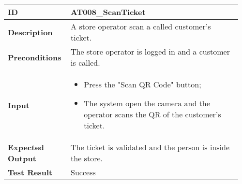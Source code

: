 \begin{table}[H]
	\centering
	\begin{tabular}{@{}p{0.25\linewidth}p{0.71\linewidth}@{}}
		\toprule
		\textbf{ID} & AT008\_ScanTicket \\
		\midrule
		\textbf{Description} & A store operator scan a called customer's ticket. \\
		\midrule
		\textbf{Preconditions} & The store operator is logged in and a customer is called.\\
		\midrule
		\textbf{Input} & \begin{itemize}[leftmargin=.4cm,noitemsep,topsep=0pt,before=\vspace{-3mm},after=\vspace{-4mm}]
			\item Press the "Scan QR Code" button;
			\item The system open the camera and the operator scans the QR of the customer's ticket.
		\end{itemize}\\
		\midrule
		\textbf{Expected Output} & The ticket is validated and the person is inside the store.\\
		\midrule
		\textbf{Test Result} & Success\\
		\bottomrule
	\end{tabular}
\end{table}

